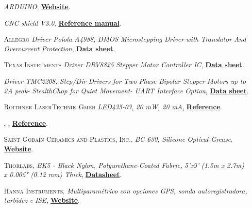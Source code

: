 \begin{thebibliography}{100}
\textit{ARDUINO}, \href{https://www.arduino.cc/}{\textbf{Website}}.

\textit{CNC shield V3.0}, \href{https://osoyoo.com/2017/04/07/arduino-uno-cnc-shield-v3-0-a4988/}{\textbf{Reference manual}}.

 \textsc{Allegro}
\textit{Driver Pololu A4988, DMOS Microstepping Driver with Translator And Overcurrent Protection}, \href{https://www.alldatasheet.es/datasheet-pdf/pdf/455036/ALLEGRO/A4988.html}{\textbf{Data sheet}}.

 \textsc{Texas Instruments}
\textit{Driver DRV8825 Stepper Motor Controller IC}, \href{https://www.ti.com/product/DRV8825?utm_source=google&utm_medium=cpc&utm_campaign=asc-null-null-GPN_EN-cpc-pf-google-wwe&utm_content=DRV8825&ds_k=DRV8825+Datasheet&DCM=yes&gclid=EAIaIQobChMIworWtYba7gIVqoFQBh10_QfhEAAYASAAEgLPn_D_BwE&gclsrc=aw.ds}{\textbf{Data sheet}}.

\textit{Driver TMC2208, Step/Dir Drivers for Two-Phase Bipolar Stepper Motors up to 2A peak- StealthChop for Quiet Movement- UART Interface Option}, \href{https://datasheetspdf.com/pdf/1142008/TRINAMIC/TMC2225/1}{\textbf{Data sheet}}.

 \textsc{Roithner LaserTechnik Gmbh}
\textit{LED435-03, 20 mW, 20 mA}, \href{http://www.roithner-laser.com/led_diverse.html}{\textbf{Reference}}.

 \textsc{},
\textit{}, \href{}{\textbf{Reference}}.

 \textsc{Saint-Gobain Ceramics and Plastics, Inc.},
\textit{BC-630, Silicone Optical Grease}, \href{https://www.crystals.saint-gobain.com/}{\textbf{Website}}.

 \textsc{Thorlabs},
\textit{BK5 - Black Nylon, Polyurethane-Coated Fabric, 5'x9' (1.5m x 2.7m) x 0.005" (0.12 mm) Thick}, \href{https://www.thorlabs.com/thorproduct.cfm?partnumber=BK5}{\textbf{Datasheet}}.

 \textsc{Hanna Instruments},
\textit{Multiparamétrico con opciones GPS, sonda autoregistradora, turbidez e ISE}, \href{https://www.hannainst.es/parametros/4654-multiparametrico-portatil-con-portasondas-multisensor-ph-orp-ce-od-temperatura.html#/507-cable_m-4_m/512-portasondas-si/513-portasondas_registrador-no/514-gps-no/515-turbidez-no}{\textbf{Website}}.


\end{thebibliography}
